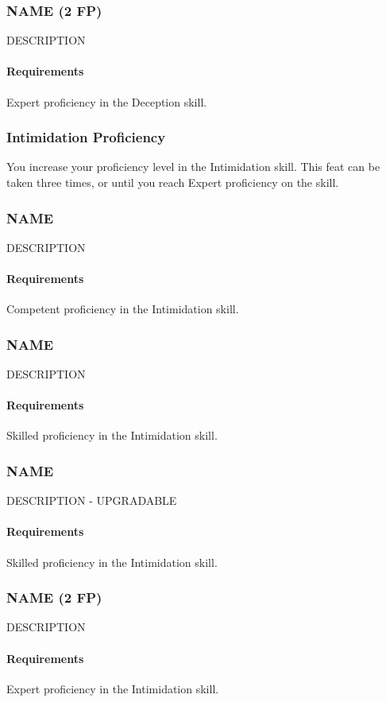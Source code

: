 \subsubsection{NAME (2 FP)} \label{feat::name}
    DESCRIPTION
    \paragraph{Requirements} Expert proficiency in the Deception skill.
\subsubsection{Intimidation Proficiency} \label{feat::intimidationprof}
    You increase your proficiency level in the Intimidation skill.
    This feat can be taken three times, or until you reach Expert proficiency on the skill.
\subsubsection{NAME} \label{feat::name}
    DESCRIPTION
    \paragraph{Requirements} Competent proficiency in the Intimidation skill.
\subsubsection{NAME} \label{feat::name}
    DESCRIPTION
    \paragraph{Requirements} Skilled proficiency in the Intimidation skill.
\subsubsection{NAME} \label{feat::name}
    DESCRIPTION - UPGRADABLE
    \paragraph{Requirements} Skilled proficiency in the Intimidation skill.
\subsubsection{NAME (2 FP)} \label{feat::name}
    DESCRIPTION
    \paragraph{Requirements} Expert proficiency in the Intimidation skill.
